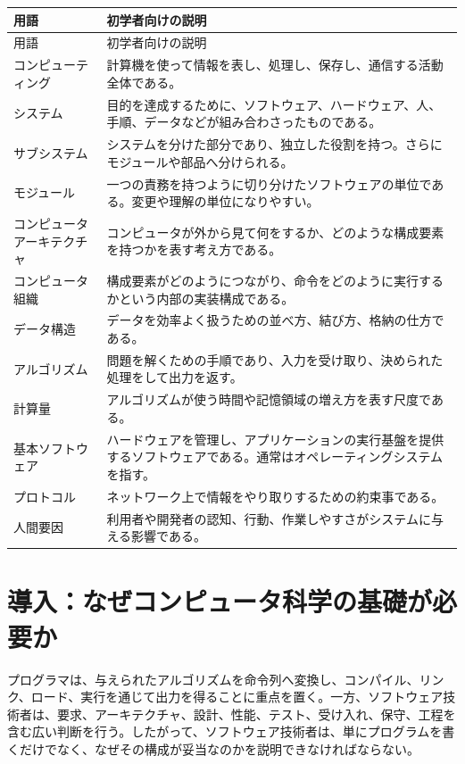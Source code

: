 \documentclass[a4paper,11pt]{ltjsarticle}
\begin{document}
\begin{longtable}{>{\raggedright\arraybackslash}p{}>{\raggedright\arraybackslash}p{}}
\toprule
用語 & 初学者向けの説明 \\
\midrule
\endfirsthead
\toprule
用語 & 初学者向けの説明 \\
\midrule
\endhead
コンピューティング & 計算機を使って情報を表し、処理し、保存し、通信する活動全体である。 \\
システム & 目的を達成するために、ソフトウェア、ハードウェア、人、手順、データなどが組み合わさったものである。 \\
サブシステム & システムを分けた部分であり、独立した役割を持つ。さらにモジュールや部品へ分けられる。 \\
モジュール & 一つの責務を持つように切り分けたソフトウェアの単位である。変更や理解の単位になりやすい。 \\
コンピュータアーキテクチャ & コンピュータが外から見て何をするか、どのような構成要素を持つかを表す考え方である。 \\
コンピュータ組織 & 構成要素がどのようにつながり、命令をどのように実行するかという内部の実装構成である。 \\
データ構造 & データを効率よく扱うための並べ方、結び方、格納の仕方である。 \\
アルゴリズム & 問題を解くための手順であり、入力を受け取り、決められた処理をして出力を返す。 \\
計算量 & アルゴリズムが使う時間や記憶領域の増え方を表す尺度である。 \\
基本ソフトウェア & ハードウェアを管理し、アプリケーションの実行基盤を提供するソフトウェアである。通常はオペレーティングシステムを指す。 \\
プロトコル & ネットワーク上で情報をやり取りするための約束事である。 \\
人間要因 & 利用者や開発者の認知、行動、作業しやすさがシステムに与える影響である。 \\
\bottomrule
\end{longtable}

\section{導入：なぜコンピュータ科学の基礎が必要か}

プログラマは、与えられたアルゴリズムを命令列へ変換し、コンパイル、リンク、ロード、実行を通じて出力を得ることに重点を置く。一方、ソフトウェア技術者は、要求、アーキテクチャ、設計、性能、テスト、受け入れ、保守、工程を含む広い判断を行う。したがって、ソフトウェア技術者は、単にプログラムを書くだけでなく、なぜその構成が妥当なのかを説明できなければならない。
\end{document}
